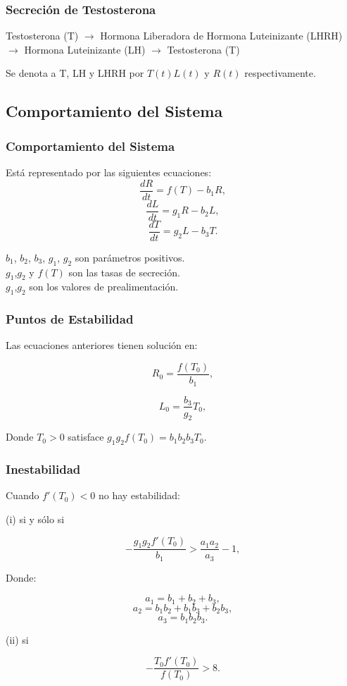 \documentclass[10pt]{beamer}
\begin{document}
\begin{frame}
\frametitle{Secreción de Testosterona}
Testosterona (T) $\rightarrow$ Hormona Liberadora de Hormona Luteinizante (LHRH) $\rightarrow$ Hormona Luteinizante (LH) $\rightarrow$ Testosterona (T)

Se denota a T, LH y LHRH por $T(t) L(t)$ y $R(t)$ respectivamente.
\end{frame}

\subsection{Comportamiento del Sistema}
\begin{frame}
\frametitle{Comportamiento del Sistema}
\begin{block}{}
Está representado por las siguientes ecuaciones:
$$\frac{dR}{dt} = f(T)-b_{1}R ,$$
$$\frac{dL}{dt} = g_{1}R-b_{2}L ,$$
$$ \frac{dT}{dt} = g_{2}L-b_{3}T .$$
\end{block}
\begin{block}{}
$b_{1}$, $b_{2}$, $b_{3}$, $g_{1}$, $g_{2}$ son parámetros positivos.\\
$g_{1}$,$g_{2}$ y $f(T)$ son las tasas de secreción.\\
$g_{1}$,$g_{2}$ son los valores de prealimentación.\\
\end{block}
\end{frame}

\begin{frame}
\frametitle{Puntos de Estabilidad}
Las ecuaciones anteriores tienen solución en:

$$R_{0} = \frac{f(T_{0})}{b_{1}} ,$$

$$L_{0} = \frac{b_{3}}{g_{2}}T_{0} ,$$

Donde $T_{0}>0$ satisface $g_{1}g_{2}f(T_{0}) = b_{1}b_{2}b_{3}T_{0} .$
\end{frame}

\begin{frame}
\frametitle{Inestabilidad}
Cuando $f'(T_{0}) < 0$ no hay estabilidad: 

(i) si y sólo si 

$$-\frac{g_{1}g_{2}f'(T_{0})}{b_{1}} > \frac{a_{1}a_{2}}{a_{3}}-1 ,$$

Donde:

$$a_{1} = b_{1}+b_{2}+b_{3} ,$$
$$a_{2}=b_{1}b_{2}+b_{1}b_{3}+b_{2}b_{3} ,$$
$$a_{3}=b_{1}b_{2}b_{3} .$$

(ii) si 

$$-\frac{T_{0}f'(T_{0})}{f(T_{0})} > 8 .$$
\end{frame}
\end{document}
